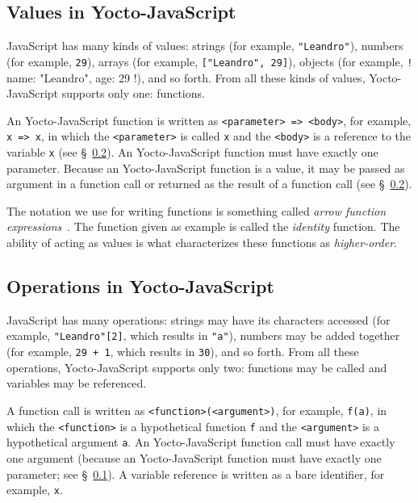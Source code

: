 \documentclass[12pt, oneside]{book}
\begin{document}
\subsection{Values in Yocto-JavaScript}
\label{Values in Yocto-JavaScript}

JavaScript has many kinds of values: strings (for example, \texttt{"Leandro"}), numbers (for example, \texttt{29}), arrays (for example, \texttt{["Leandro", 29]}), objects (for example, \texttt!{ name: "Leandro", age: 29 }!), and so forth. From all these kinds of values, Yocto-JavaScript supports only one: functions.

An Yocto-JavaScript function is written as \verb!<parameter> => <body>!, for example, \texttt{x => x}, in which the \verb!<parameter>! is called \texttt{x} and the \verb!<body>! is a reference to the variable \texttt{x} (see §~\ref{Operations in Yocto-JavaScript}). An Yocto-JavaScript function must have exactly one parameter. Because an Yocto-JavaScript function is a value, it may be passed as argument in a function call or returned as the result of a function call (see §~\ref{Operations in Yocto-JavaScript}).

\begin{mdframed}[frametitle = {Technical Terms}]
The notation we use for writing functions is something called \emph{arrow function expressions}~\cite{arrow-function-expressions}. The function given as example is called the \emph{identity} function. The ability of acting as values is what characterizes these functions as \emph{higher-order}.
\end{mdframed}

\subsection{Operations in Yocto-JavaScript}
\label{Operations in Yocto-JavaScript}

JavaScript has many operations: strings may have its characters accessed (for example, \texttt{"Leandro"[2]}, which results in \texttt{"a"}), numbers may be added together (for example, \texttt{29 + 1}, which results in \texttt{30}), and so forth. From all these operations, Yocto-JavaScript supports only two: functions may be called and variables may be referenced.

A function call is written as \verb!<function>(<argument>)!, for example, \texttt{f(a)}, in which the \verb!<function>! is a hypothetical function \texttt{f} and the \verb!<argument>! is a hypothetical argument \texttt{a}. An Yocto-JavaScript function call must have exactly one argument (because an Yocto-JavaScript function must have exactly one parameter; see §~\ref{Values in Yocto-JavaScript}). A variable reference is written as a bare identifier, for example, \texttt{x}.
\end{document}
